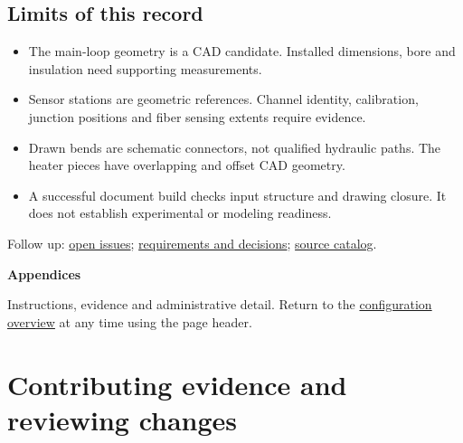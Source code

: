 \documentclass[11pt]{article}
\begin{document}
\subsection*{Limits of this record}
\begin{itemize}\item The main-loop geometry is a CAD candidate. Installed dimensions, bore and insulation need supporting measurements.\item Sensor stations are geometric references. Channel identity, calibration, junction positions and fiber sensing extents require evidence.\item Drawn bends are schematic connectors, not qualified hydraulic paths. The heater pieces have overlapping and offset CAD geometry.\item A successful document build checks input structure and drawing closure. It does not establish experimental or modeling readiness.\end{itemize}
\vfill{\small Follow up: \hyperref[issues-detail]{open issues}; \hyperref[requirements]{requirements and decisions}; \hyperref[sources-detail]{source catalog}.}\par
\clearpage{}\label{appendices}
{\color{navy}\LARGE\bfseries Appendices}\par
Instructions, evidence and administrative detail. Return to the \hyperref[overview]{configuration overview} at any time using the page header.\par
\tableofcontents
\appendix
\clearpage\section{Contributing evidence and reviewing changes}\label{administration}
\end{document}
